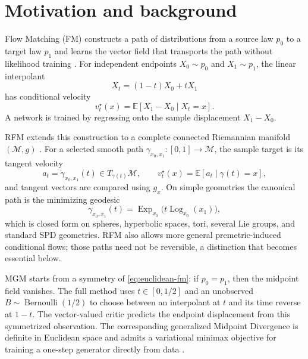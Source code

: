 \documentclass[10pt,twocolumn]{article}
\newcommand{\M}{\mathcal{M}}
\newcommand{\E}{\mathbb{E}}
\newcommand{\Exp}{\operatorname{Exp}}
\newcommand{\Log}{\operatorname{Log}}
\newcommand{\Ber}{\operatorname{Bernoulli}}
\begin{document}
\section{Motivation and background}

Flow Matching (FM) constructs a path of distributions from a source law $p_0$ to a target law $p_1$ and learns the vector field that transports the path without likelihood training \citep{lipman2023flow,albergo2023building}. For independent endpoints $X_0\sim p_0$ and $X_1\sim p_1$, the linear interpolant
\begin{equation}
X_t=(1-t)X_0+tX_1
\end{equation}
has conditional velocity
\begin{equation}
 v_t^\star(x)=\E[X_1-X_0\mid X_t=x].
 \label{eq:euclidean-fm}
\end{equation}
A network is trained by regressing onto the sample displacement $X_1-X_0$.

RFM extends this construction to a complete connected Riemannian manifold $(\M,g)$ \citep{chen2024general}. For a selected smooth path $\gamma_{x_0,x_1}:[0,1]\to\M$, the sample target is its tangent velocity
\begin{equation}
 a_t=\dot\gamma_{x_0,x_1}(t)\in T_{\gamma(t)}\M,
 \qquad
 v_t^\star(x)=\E[a_t\mid \gamma(t)=x],
 \label{eq:rfm-field}
\end{equation}
and tangent vectors are compared using $g_x$. On simple geometries the canonical path is the minimizing geodesic
\begin{equation}
 \gamma_{x_0,x_1}(t)=\Exp_{x_0}\!\bigl(t\Log_{x_0}(x_1)\bigr),
 \label{eq:geodesic}
\end{equation}
which is closed form on spheres, hyperbolic spaces, tori, several Lie groups, and standard SPD geometries. RFM also allows more general premetric-induced conditional flows; those paths need not be reversible, a distinction that becomes essential below.

MGM starts from a symmetry of \cref{eq:euclidean-fm}: if $p_0=p_1$, then the midpoint field vanishes. The full method uses $t\in[0,1/2]$ and an unobserved $B\sim\Ber(1/2)$ to choose between an interpolant at $t$ and its time reverse at $1-t$. The vector-valued critic predicts the endpoint displacement from this symmetrized observation. The corresponding generalized Midpoint Divergence is definite in Euclidean space and admits a variational minimax objective for training a one-step generator directly from data \citep{shlenskii2026midpoint}.
\end{document}
